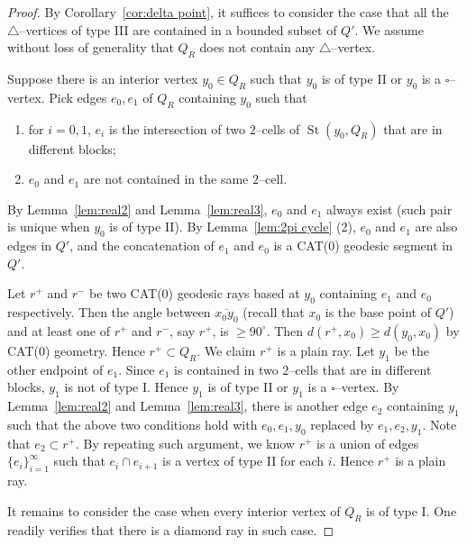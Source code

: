 \documentclass[11pt]{amsart}
\newcommand{\St}{\operatorname{St}}
\theoremstyle{definition}
\begin{document}
\begin{proof}
By Corollary~\ref{cor:delta point}, it suffices to consider the case that all the $\triangle$--vertices of type III are contained in a bounded subset of $Q'$. We assume without loss of generality that $Q_R$ does not contain any $\triangle$--vertex. 

Suppose there is an interior vertex $y_0\in Q_R$ such that $y_0$ is of type II or $y_0$ is a $\square$--vertex. Pick edges $e_0,e_1$ of $Q_R$ containing $y_0$ such that
\begin{enumerate}
	\item for $i=0,1$, $e_i$ is the intersection of two $2$--cells of $\St(y_0,Q_R)$ that are in different blocks;
	\item $e_0$ and $e_1$ are not contained in the same $2$--cell.
\end{enumerate}
By Lemma~\ref{lem:real2} and Lemma~\ref{lem:real3}, $e_0$ and $e_1$ always exist (such pair is unique when $y_0$ is of type II). By Lemma~\ref{lem:2pi cycle} (2), $e_0$ and $e_1$ are also edges in $Q'$, and the concatenation of $e_1$ and $e_0$ is a CAT(0) geodesic segment in $Q'$. 

Let $r^+$ and $r^-$ be two CAT(0) geodesic rays based at $y_0$ containing $e_1$ and $e_0$ respectively. Then the angle between $\overline{x_0y_0}$ (recall that $x_0$ is the base point of $Q'$) and at least one of $r^+$ and $r^-$, say $r^+$, is $\ge 90^{\circ}$. Then $d(r^+,x_0)\ge d(y_0,x_0)$ by CAT(0) geometry. Hence $r^+\subset Q_R$. We claim $r^+$ is a plain ray. Let $y_1$ be the other endpoint of $e_1$. Since $e_1$ is contained in two $2$--cells that are in different blocks, $y_1$ is not of type I. Hence $y_1$ is of type II or $y_1$ is a $\square$--vertex. By Lemma~\ref{lem:real2} and Lemma~\ref{lem:real3}, there is another edge $e_2$ containing $y_1$ such that the above two conditions hold with $e_0,e_1,y_0$ replaced by $e_1,e_2,y_1$. Note that $e_2\subset r^+$. By repeating such argument, we know $r^+$ is a union of edges $\{e_i\}_{i=1}^{\infty}$ such that $e_i\cap e_{i+1}$ is a vertex of type II for each $i$. Hence $r^+$ is a plain ray.

It remains to consider the case when every interior vertex of $Q_R$ is of type I. One readily verifies that there is a diamond ray in such case.
\end{proof}
\end{document}
